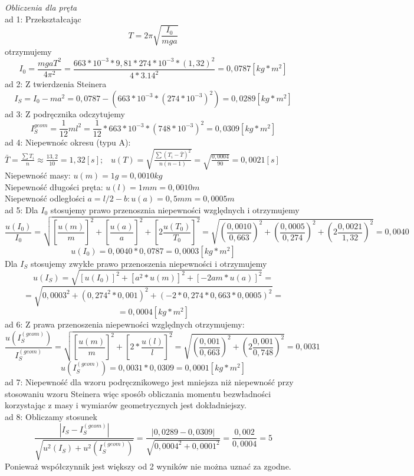 \documentclass[a4paper,10pt,twoside]{article}
\begin{document}
\textit{Obliczenia dla pręta}
\noindent \\
ad 1: Przekształcając 
$$
T = 2\pi\sqrt{\frac{I_0}{mga}}
$$
otrzymujemy
$$
I_0 = \frac{mgaT^2}{4\pi^2} = \frac{663 * 10^{-3} * 9,81 * 274 * 10^{-3} * (1,32)^2}{4*3.14^2} = 0,0787[kg*m^2]
$$
ad 2: Z twierdzenia Steinera 
$$
I_S = I_0 - ma^2 = 0,0787 - (663*10^{-3}*(274*10^{-3})^2) = 0,0289[kg*m^2]
$$
ad 3: Z podręcznika odczytujemy $$I_S^{geom} = \frac{1}{12}ml^2 = \frac{1}{12}*663*10^{-3}*(748*10^{-3})^2 = 0,0309[kg*m^2]
$$
ad 4: Niepewnośc okresu (typu A): $\bar{T} = \frac{\sum T_i}{n} \approx \frac{13,2}{10} = 1,32[s] ;\hspace{10pt} u(T) = \sqrt{\frac{\sum (T_i - \bar{T})^2}{n(n-1)}} = \sqrt{\frac{0,0004}{90}} = 0,0021[s] 
$
\\ Niepewność masy: $u(m) = 1 g = 0,0010 kg$ 
\\ Niepewność długości pręta: $u(l) = 1 mm = 0,0010 m$
\\ Niepewność odległości $a = l/2 - b: u(a) = 0,5mm = 0,0005 m$
\\ad 5: Dla $I_0$ stosujemy prawo przenosznia niepewności względnych i otrzymujemy 
$$
\frac{u(I_0)}{I_0} = \sqrt{\left[\frac{u(m)}{m}\right]^2 + \left[\frac{u(a)}{a}\right]^2 + \left[2\frac{u(T_0)}{T_0}\right]^2} = \sqrt{\left(\frac{0,0010}{0,663}\right)^2 + \left(\frac{0,0005}{0,274}\right)^2 + \left(2\frac{0,0021}{1,32}\right)^2} = 0,0040
$$
$$
u(I_0) = 0,0040 * 0,0787 = 0,0003[kg * m^2]
$$
Dla $I_S$ stosujemy zwykłe prawo przenoszenia niepewności i otrzymujemy 
$$
u(I_S) = \sqrt{[u(I_0)]^2 + [a^2 * u(m)]^2 + [-2 am * u(a)]^2} =$$ $$= \sqrt{0,0003^2 + (0,274^2 * 0,001)^2 + (-2*0,274*0,663*0,0005)^2} = $$
$$ = 0,0004[kg * m^2]
$$
ad 6: Z prawa przenoszenia niepewności względnych otrzymujemy:
$$
\frac{u(I_S^{(geom)})}{I_S^{(geom)}} = \sqrt{\left[\frac{u(m)}{m}\right]^2 + \left[2*\frac{u(l)}{l}\right]^2} = \sqrt{\left(\frac{0,001}{0,663}\right)^2 + \left(2\frac{0,001}{0,748}\right)^2} = 0,0031
$$
$$
u(I_S^{(geom)}) = 0,0031 * 0,0309 = 0,0001[kg*m^2]
$$
ad 7: Niepewność dla wzoru podręcznikowego jest mniejsza niż niepewność przy stosowaniu wzoru Steinera więc sposób obliczania momentu bezwładności korzystając z masy i wymiarów geometrycznych jest dokładniejszy.
\\ad 8: Obliczamy stosunek
$$
\frac{|I_S - I_S^{(geom)}|}{\sqrt{u^2(I_S) +  u^2(I_S^{(geom)})}} = \frac{|0,0289 - 0,0309|}{\sqrt{0,0004^2 + 0,0001^2}} = \frac{0,002}{0,0004} = 5
$$
Ponieważ współczynnik jest większy od 2 wyników nie można uznać za zgodne.
\vspace{20pt}
\end{document}
